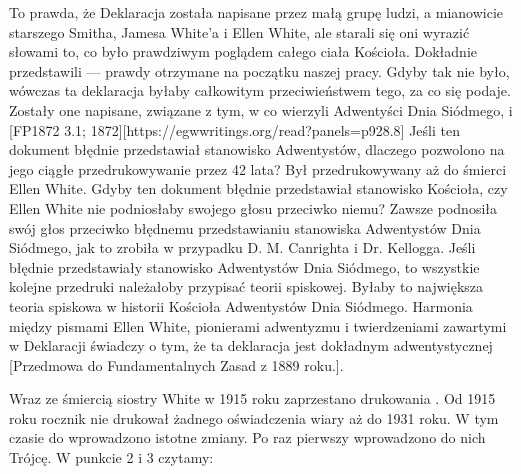 To prawda, że Deklaracja  została napisane przez małą grupę ludzi, a mianowicie starszego Smitha, Jamesa White'a i Ellen White, ale starali się oni wyrazić słowami to, co było prawdziwym poglądem całego ciała Kościoła. Dokładnie przedstawili  — prawdy otrzymane na początku naszej pracy. Gdyby tak nie było, wówczas ta deklaracja byłaby całkowitym przeciwieństwem tego, za co się podaje. Zostały one napisane,  związane z tym, w co wierzyli Adwentyści Dnia Siódmego,  i [FP1872 3.1; 1872][https://egwwritings.org/read?panels=p928.8] Jeśli ten dokument błędnie przedstawiał stanowisko Adwentystów, dlaczego pozwolono na jego ciągłe przedrukowywanie przez 42 lata? Był przedrukowywany aż do śmierci Ellen White. Gdyby ten dokument błędnie przedstawiał stanowisko Kościoła, czy Ellen White nie podniosłaby swojego głosu przeciwko niemu? Zawsze podnosiła swój głos przeciwko błędnemu przedstawianiu stanowiska Adwentystów Dnia Siódmego, jak to zrobiła w przypadku D. M. Canrighta i Dr. Kellogga. Jeśli  błędnie przedstawiały stanowisko Adwentystów Dnia Siódmego, to wszystkie kolejne przedruki należałoby przypisać teorii spiskowej. Byłaby to największa teoria spiskowa w historii Kościoła Adwentystów Dnia Siódmego. Harmonia między pismami Ellen White, pionierami adwentyzmu i twierdzeniami zawartymi w Deklaracji  świadczy o tym, że ta deklaracja jest dokładnym  adwentystycznej [Przedmowa do Fundamentalnych Zasad z 1889 roku.].

Wraz ze śmiercią siostry White w 1915 roku zaprzestano drukowania . Od 1915 roku rocznik nie drukował żadnego oświadczenia wiary aż do 1931 roku. W tym czasie do  wprowadzono istotne zmiany. Po raz pierwszy wprowadzono do nich Trójcę. W punkcie 2 i 3 czytamy:


